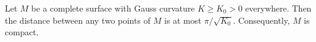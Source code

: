 Let $M$ be a complete surface with Gauss curvature $K \geq K_0 > 0$ everywhere. Then the distance between any two points of $M$ is at most $\pi/\sqrt{K_0}$. Consequently, $M$ is compact.